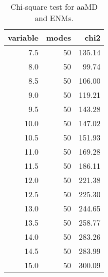 \begin{table}[center]
\centering
\caption{Chi-square test for aaMD and ENMs.}
\label{tab:chi2}
\begin{tabular}{rrr}
\toprule
 variable &  modes &   chi2 \\
\midrule
      7.5 &     50 & 135.14 \\
      8.0 &     50 &  99.74 \\
      8.5 &     50 & 106.00 \\
      9.0 &     50 & 119.21 \\
      9.5 &     50 & 143.28 \\
     10.0 &     50 & 147.02 \\
     10.5 &     50 & 151.93 \\
     11.0 &     50 & 169.28 \\
     11.5 &     50 & 186.11 \\
     12.0 &     50 & 221.38 \\
     12.5 &     50 & 225.30 \\
     13.0 &     50 & 244.65 \\
     13.5 &     50 & 258.77 \\
     14.0 &     50 & 283.26 \\
     14.5 &     50 & 283.99 \\
     15.0 &     50 & 300.09 \\
\bottomrule
\end{tabular}
\end{table}
